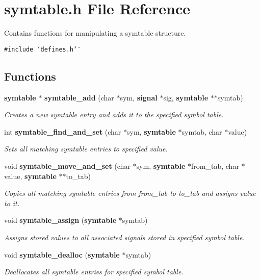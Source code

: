 \section{symtable.h File Reference}
\label{symtable_8h}
Contains functions for manipulating a symtable structure. 


{\tt \#include \char`\"{}defines.h\char`\"{}}\par
\subsection*{Functions}
\begin{CompactItemize}
\item 
{\bf symtable} $\ast$ {\bf symtable\_\-add} (char $\ast$sym, {\bf signal} $\ast$sig, {\bf symtable} $\ast$$\ast$symtab)
\begin{CompactList}\small\item\em Creates a new symtable entry and adds it to the specified symbol table.\item\end{CompactList}\item 
int {\bf symtable\_\-find\_\-and\_\-set} (char $\ast$sym, {\bf symtable} $\ast$symtab, char $\ast$value)
\begin{CompactList}\small\item\em Sets all matching symtable entries to specified value.\item\end{CompactList}\item 
void {\bf symtable\_\-move\_\-and\_\-set} (char $\ast$sym, {\bf symtable} $\ast$from\_\-tab, char $\ast$value, {\bf symtable} $\ast$$\ast$to\_\-tab)
\begin{CompactList}\small\item\em Copies all matching symtable entries from from\_\-tab to to\_\-tab and assigns value to it.\item\end{CompactList}\item 
void {\bf symtable\_\-assign} ({\bf symtable} $\ast$symtab)
\begin{CompactList}\small\item\em Assigns stored values to all associated signals stored in specified symbol table.\item\end{CompactList}\item 
void {\bf symtable\_\-dealloc} ({\bf symtable} $\ast$symtab)
\begin{CompactList}\small\item\em Deallocates all symtable entries for specified symbol table.\item\end{CompactList}\end{CompactItemize}


